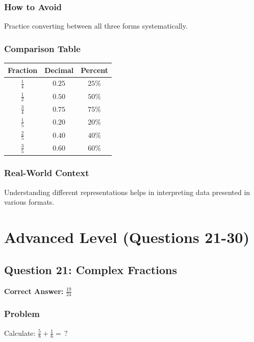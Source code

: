 \documentclass[12pt,a4paper]{article}
\begin{document}
\subsubsection*{How to Avoid}
Practice converting between all three forms systematically.

\subsubsection*{Comparison Table}

\begin{center}
\begin{tabular}{|c|c|c|}
\toprule
\textbf{Fraction} & \textbf{Decimal} & \textbf{Percent} \\
\midrule
$\frac{1}{4}$ & $0.25$ & $25\%$ \\
$\frac{1}{2}$ & $0.50$ & $50\%$ \\
$\frac{3}{4}$ & $0.75$ & $75\%$ \\
$\frac{1}{5}$ & $0.20$ & $20\%$ \\
$\frac{2}{5}$ & $0.40$ & $40\%$ \\
$\frac{3}{5}$ & $0.60$ & $60\%$ \\
\bottomrule
\end{tabular}
\end{center}

\subsubsection*{Real-World Context}
Understanding different representations helps in interpreting data presented in various formats.

\newpage

\section{Advanced Level (Questions 21-30)}

\subsection*{Question 21: Complex Fractions}

\textbf{Correct Answer:} $\frac{19}{24}$

\subsubsection*{Problem}
Calculate: $\frac{5}{8} + \frac{1}{6} = \,?$
\end{document}
